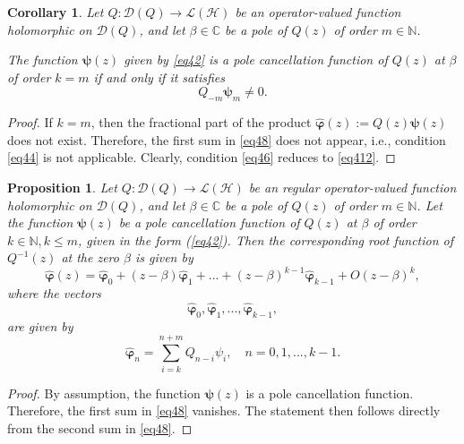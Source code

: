 \documentclass[11pt, reqno]{amsart}
\theoremstyle{plain}
\newtheorem{cor}{Corollary}[section]
\newtheorem{propo}{Proposition}[section]
\theoremstyle{remark}
\numberwithin{equation}{section}
\begin{document}
\begin{cor}\label{corollary44} Let $Q : \mathcal{D}(Q) \rightarrow \mathcal{L}(\mathcal{H})$ be an operator-valued function holomorphic on $\mathcal{D}(Q)$, and let $\beta \in \mathbb{C}$ be a pole of $Q(z)$ of order $m \in \mathbb{N}$.

The function $\boldsymbol{\psi}(z)$ given by \eqref{eq42} is a pole cancellation function of $Q(z)$ at $\beta$ of order $k = m$
if and only if it satisfies
\begin{equation}\label{eq412}
Q_{-m} \boldsymbol{\psi}_{m} \neq 0.
\end{equation}
\end{cor}

\begin{proof}
If $k = m$, then the fractional part of the product $\boldsymbol{\hat{\varphi}}(z) := Q(z)\boldsymbol{\psi}(z)$ does not exist. Therefore, the first sum in \eqref{eq48} does not appear, i.e., condition \eqref{eq44} is not applicable. Clearly, condition \eqref{eq46} reduces to \eqref{eq412}.
\end{proof}

\begin{propo}\label{proposition46}
Let $Q: \mathcal{D}(Q) \rightarrow \mathcal{L}(\mathcal{H})$ be an regular operator-valued function holomorphic on $\mathcal{D}(Q)$, and let $\beta \in \mathbb{C}$ be a pole of $Q(z)$ of order $m \in \mathbb{N}$. Let the function $\boldsymbol{\psi}(z)$ be a pole cancellation function of 
$Q(z)$ at $\beta$ of order $k \in \mathbb{N}, k\le m$, given in the form 
(\ref{eq42}). Then the corresponding root function of $Q^{-1}(z)$ at the zero $\beta$ is given by 
\begin{equation}\label{eq414} 
\boldsymbol{\hat{\varphi}}(z)=\boldsymbol{\hat{\varphi}}_{0}+(z-\beta)\boldsymbol{\hat{\varphi}}_{1}+...+(z-\beta)^{k-1}\boldsymbol{\hat{\varphi}}_{k-1}+O(z-\beta)^{k},
\end{equation}
where the vectors
\[
\boldsymbol{\hat{\varphi}}_{0},\boldsymbol{\hat{\varphi}}_{1},...,\boldsymbol{\hat{\varphi}}_{k-1},
\]
are given by
\begin{equation}\label{eq416} 
\boldsymbol{\hat{\varphi}}_{n}= \sum_{i=k}^{n+m}Q_{n-i}\psi_{i}, \quad n=0, 1,...,k-1.
\end{equation}
\end{propo}
\begin{proof} By assumption, the function $\boldsymbol{\psi}(z)$ is a pole cancellation function. Therefore, the first sum in \eqref{eq48} vanishes. The statement then follows directly from the second sum in \eqref{eq48}.
\end{proof} 
\end{document}
